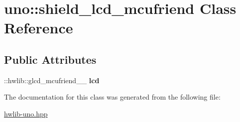 \hypertarget{classuno_1_1shield__lcd__mcufriend}{}\section{uno\+:\+:shield\+\_\+lcd\+\_\+mcufriend Class Reference}
\label{classuno_1_1shield__lcd__mcufriend}
\subsection*{Public Attributes}
\begin{DoxyCompactItemize}
\item 
\+::hwlib\+::glcd\+\_\+mcufriend\+\_\+\_ {\bfseries lcd}\hypertarget{classuno_1_1shield__lcd__mcufriend_ab38b50a962a880dba75d5cc8b204bd62}{}\label{classuno_1_1shield__lcd__mcufriend_ab38b50a962a880dba75d5cc8b204bd62}

\end{DoxyCompactItemize}


The documentation for this class was generated from the following file\+:\begin{DoxyCompactItemize}
\item 
\hyperlink{hwlib-uno_8hpp}{hwlib-\/uno.\+hpp}\end{DoxyCompactItemize}
